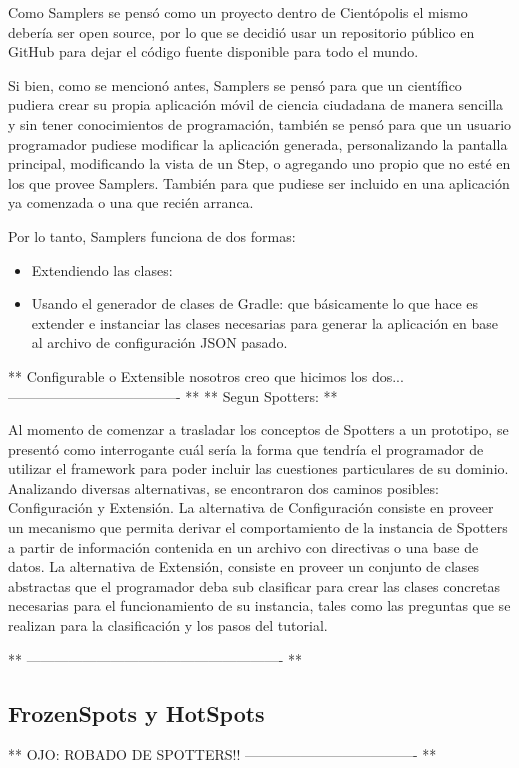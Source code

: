 Como Samplers se pensó como un proyecto dentro de Cientópolis\cite{cientopolis} el mismo debería ser open source, por lo que se decidió usar un repositorio público en GitHub\cite{github} para dejar el código fuente disponible para todo el mundo.

Si bien, como se mencionó antes, Samplers se pensó para que un científico pudiera crear su propia aplicación móvil de ciencia ciudadana de manera sencilla y sin tener conocimientos de programación, también se pensó para que un usuario programador pudiese modificar la aplicación generada, personalizando la pantalla principal, modificando la vista de un Step, o agregando uno propio que no esté en los que provee Samplers. También para que pudiese ser incluido en una aplicación ya comenzada o una que recién arranca.

Por lo tanto, Samplers funciona de dos formas:
\begin{itemize}
\item Extendiendo las clases: 
\item Usando el generador de clases de Gradle: que básicamente lo que hace es extender e instanciar las clases necesarias para generar la aplicación en base al archivo de configuración JSON pasado.
\end{itemize}

** Configurable o Extensible nosotros creo que hicimos los dos... ------------------------------------- **
** Segun Spotters: **

Al momento de comenzar a trasladar los conceptos de Spotters a un prototipo, se presentó  como  interrogante  cuál  sería  la  forma  que  tendría  el  programador  de  utilizar el  framework  para  poder  incluir  las  cuestiones  particulares  de  su  dominio.  Analizando diversas alternativas, se encontraron dos caminos posibles: Configuración y Extensión. 
La  alternativa  de  Configuración  consiste  en  proveer  un  mecanismo  que  permita derivar el comportamiento de la instancia de Spotters a partir de información contenida en  un  archivo  con  directivas  o  una  base  de  datos.  La  alternativa  de Extensión,  consiste en  proveer  un  conjunto  de  clases  abstractas  que  el  programador  deba  sub  clasificar para crear las clases concretas necesarias para el funcionamiento de su instancia, tales como las preguntas que se realizan para la clasificación y los pasos del tutorial.

** ------------------------------------------------------- **


\subsection{FrozenSpots y HotSpots}
** OJO: ROBADO DE SPOTTERS!! ------------------------------------- **

